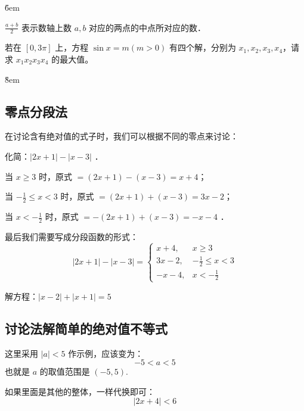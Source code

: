 \v{6em}

\begin{theorem}[数轴上的中点]
    $\frac{a+b}{2}$ 表示数轴上数 $a, b$ 对应的两点的中点所对应的数．
\end{theorem}

\begin{example}
    若在 $[0,3\pi]$ 上，方程 $\sin x = m (m > 0)$ 有四个解，分别为 $x_1, x_2, x_3, x_4$，请求 $x_1x_2x_3x_4$ 的最大值。
\end{example}

\v{8em}

\subsection{零点分段法}

在讨论含有绝对值的式子时，我们可以根据不同的零点来讨论：

\begin{example}
    化简：$|2 x+1|-|x-3|$ ．
\end{example}

\begin{solution}
    当 $x \geqslant 3$ 时，原式 $=(2 x+1)-(x-3)=x+4$；

    当 $-\frac{1}{2} \leqslant x<3$ 时，原式 $=(2 x+1)+(x-3)=3 x-2$；

    当 $x<-\frac{1}{2}$ 时，原式 $=-(2 x+1)+(x-3)=-x-4$ ．

    最后我们需要写成分段函数的形式：
    $$
        |2 x+1|-|x-3|= \begin{cases}
            x+4,   & x \geqslant 3              \\
            3 x-2, & -\frac{1}{2} \leqslant x<3 \\
            -x-4,  & x<-\frac{1}{2}
        \end{cases}
    $$
\end{solution}

\begin{example}
    解方程：$|x-2|+|x+1|=5$
\end{example}

\vspace{10em}

\subsection{讨论法解简单的绝对值不等式}

\begin{theorem}[简单的绝对值不等式]
    这里采用 $|a| < 5$ 作示例，应该变为：
    $$        -5 < a < 5$$
    也就是 $a$ 的取值范围是 $(-5, 5)$.

    如果里面是其他的整体，一样代换即可：
    $$ |2x+4| < 6$$
\end{theorem}

